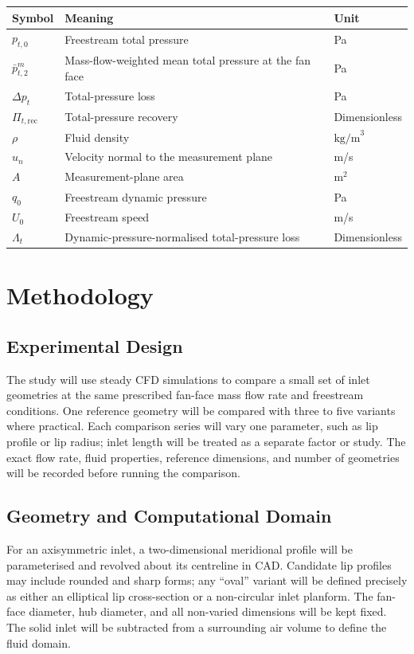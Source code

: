 \documentclass[11pt]{article}
\begin{document}
\begin{center}
\begin{tabular}{lll}
\hline
\textbf{Symbol} & \textbf{Meaning} & \textbf{Unit} \\
\hline
$p_{t,0}$ & Freestream total pressure & Pa \\
$\bar{p}_{t,2}^m$ & Mass-flow-weighted mean total pressure at the fan face & Pa \\
$\Delta p_t$ & Total-pressure loss & Pa \\
$\Pi_{t,\text{rec}}$ & Total-pressure recovery & Dimensionless \\
$\rho$ & Fluid density & $\text{kg/m}^3$ \\
$u_n$ & Velocity normal to the measurement plane & m/s \\
$A$ & Measurement-plane area & $\text{m}^2$ \\
$q_0$ & Freestream dynamic pressure & Pa \\
$U_0$ & Freestream speed & m/s \\
$\Lambda_t$ & Dynamic-pressure-normalised total-pressure loss & Dimensionless \\
\hline
\end{tabular}
\end{center}

\section{Methodology}
\subsection{Experimental Design}
The study will use steady CFD simulations to compare a small set of inlet geometries at the same prescribed fan-face mass flow rate and freestream conditions. One reference geometry will be compared with three to five variants where practical. Each comparison series will vary one parameter, such as lip profile or lip radius; inlet length will be treated as a separate factor or study. The exact flow rate, fluid properties, reference dimensions, and number of geometries will be recorded before running the comparison.

\subsection{Geometry and Computational Domain}
For an axisymmetric inlet, a two-dimensional meridional profile will be parameterised and revolved about its centreline in CAD. Candidate lip profiles may include rounded and sharp forms; any ``oval'' variant will be defined precisely as either an elliptical lip cross-section or a non-circular inlet planform. The fan-face diameter, hub diameter, and all non-varied dimensions will be kept fixed. The solid inlet will be subtracted from a surrounding air volume to define the fluid domain.
\end{document}
